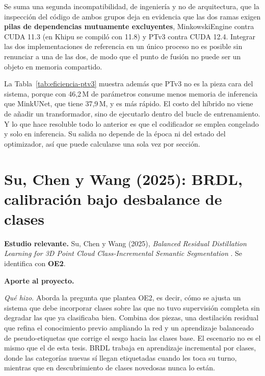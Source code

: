 Se suma una segunda incompatibilidad, de ingeniería y no de arquitectura, que la
inspección del código de ambos grupos deja en evidencia que las dos ramas exigen
\textbf{pilas de dependencias mutuamente excluyentes}, MinkowskiEngine contra
CUDA 11.3 (en Khipu se compiló con 11.8) y PTv3 contra CUDA 12.4. Integrar las dos implementaciones de
referencia en un único proceso no es posible sin renunciar a una de las dos, de
modo que el punto de fusión no puede ser un objeto en memoria compartido.

La Tabla~\ref{tab:eficiencia-ptv3} muestra además que PTv3 no es la
pieza cara del sistema, porque con 46,2\,M de parámetros consume menos memoria de
inferencia que MinkUNet, que tiene 37,9\,M, y es más rápido. El costo del híbrido
no viene de añadir un transformador, sino de ejecutarlo dentro del bucle de
entrenamiento. Y lo que hace resoluble todo lo anterior es que el codificador se
emplea congelado y solo en inferencia. Su salida no depende de la época ni del
estado del optimizador, así que puede calcularse una sola vez por sección.

\section[BRDL]{Su, Chen y Wang (2025): BRDL, calibración bajo desbalance de
clases}
\label{sec:brdl}

\textbf{Estudio relevante.} Su, Chen y Wang (2025), \emph{Balanced Residual
Distillation Learning for 3D Point Cloud Class-Incremental Semantic
Segmentation} \cite{su2025brdl}. Se identifica con \textbf{OE2}.

\textbf{Aporte al proyecto.}

\emph{Qué hizo.} Aborda la pregunta que plantea OE2, es decir, cómo se ajusta un sistema
que debe incorporar clases sobre las que no tuvo supervisión completa sin
degradar las que ya clasificaba bien. Combina dos piezas, una destilación
residual que refina el conocimiento previo ampliando la red y un aprendizaje
balanceado de pseudo-etiquetas que corrige el sesgo hacia las clases base. El
escenario no es el mismo que el de esta tesis. BRDL trabaja en aprendizaje
incremental por clases, donde las categorías nuevas sí llegan etiquetadas cuando
les toca su turno, mientras que en descubrimiento de clases novedosas nunca lo
están.


